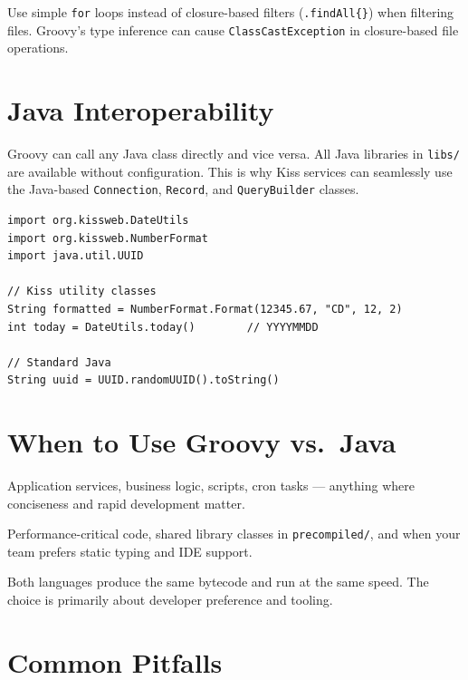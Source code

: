 \begin{warnbox}
Use simple \texttt{for} loops instead of closure-based filters (\texttt{.findAll\{\}}) when filtering files.  Groovy's type inference can cause \texttt{ClassCastException} in closure-based file operations.
\end{warnbox}

\section{Java Interoperability}
\label{sec:groovy-java}

Groovy can call any Java class directly and vice versa.  All Java libraries in \texttt{libs/} are available without configuration.  This is why Kiss services can seamlessly use the Java-based \texttt{Connection}, \texttt{Record}, and \texttt{QueryBuilder} classes.

\begin{lstlisting}[style=groovy]
import org.kissweb.DateUtils
import org.kissweb.NumberFormat
import java.util.UUID

// Kiss utility classes
String formatted = NumberFormat.Format(12345.67, "CD", 12, 2)
int today = DateUtils.today()        // YYYYMMDD

// Standard Java
String uuid = UUID.randomUUID().toString()
\end{lstlisting}

\section{When to Use Groovy vs.\ Java}
\label{sec:groovy-vs-java}

\begin{description}[style=nextline]
  \item[Use Groovy for] Application services, business logic, scripts, cron tasks --- anything where conciseness and rapid development matter.
  \item[Use Java for] Performance-critical code, shared library classes in \texttt{precompiled/}, and when your team prefers static typing and IDE support.
\end{description}

\noindent
Both languages produce the same bytecode and run at the same speed.  The choice is primarily about developer preference and tooling.

\section{Common Pitfalls}
\label{sec:groovy-pitfalls}

